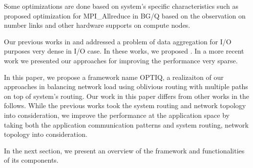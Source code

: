 Some optimizations are done based on system’s specific characteristics such as \cite{Kumar:Allreduce} proposed optimization for MPI\_Allreduce in BG/Q based on the observation on number links and other hardware supports on compute nodes.

Our previous works in \cite{Vishwanath:GLEAN} and \cite{SDAV:Bui2014b} addressed a problem of data aggregation for I/O purposes very dense in I/O case. In these works, we proposed . In a more recent work \cite{hbui:bgq} we presented our approaches for improving the performance very sparse. 

In this paper, we propose a framework name OPTIQ, a realizaiton of our approaches in balancing network load using oblivious routing with multiple paths on top of system's routing. Our work in this paper differs from other works in the follows. While the previous works took the system routing and network topology into consideration, we improve the performance at the application space by taking both the application communication patterns and system routing, network topology into consideration. 

In the next section, we present an overview of the framework and functionalities of its components.
